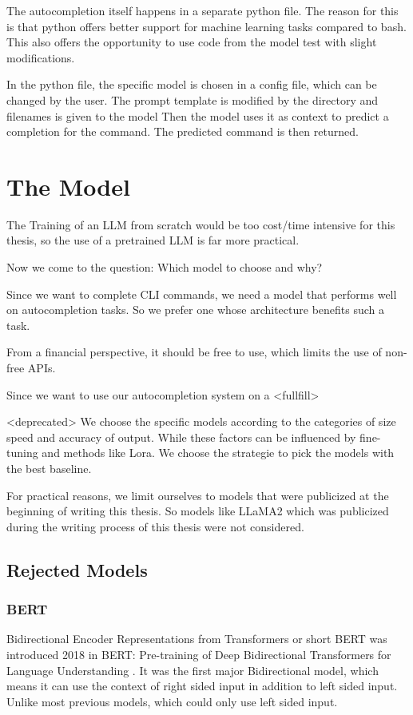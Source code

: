 The autocompletion itself happens in a separate python file. The reason for this is that python offers better support for machine learning tasks compared to bash. This also offers the opportunity to use code from the model test with slight modifications.

In the python file, the specific model is chosen in a config file, which can be changed by the user.
The prompt template is modified by the directory and filenames is given to the model
Then the model uses it as context to predict  a completion for the command.
The predicted command is then returned.



\section{The Model}\raggedbottom
The Training of an LLM from scratch would be too  cost/time intensive for this thesis, so the use of a pretrained LLM is far more practical.


Now  we come to the question: Which model to choose and why? 

Since we want to complete CLI commands, we need a model that performs well on autocompletion tasks. So we prefer one whose architecture benefits such a task.


From a financial perspective, it should be free to use, which limits the use of non-free APIs.


Since we want to use our autocompletion system on a 
<fullfill>

<deprecated>
We choose the specific models according to the categories of size speed and accuracy of output. While these factors can be influenced by fine-tuning and methods like Lora. We choose the strategie to pick the models with the best baseline.


For practical reasons, we limit ourselves to models that were publicized at the beginning of writing this thesis. So models like LLaMA2 which was publicized during the writing process of this thesis were not considered.



\subsection{Rejected Models}


\subsubsection{BERT}
Bidirectional Encoder Representations from Transformers or short BERT was introduced  2018  in BERT: Pre-training of Deep Bidirectional Transformers for
Language Understanding \cite{devlin2019bert}. It was the first major Bidirectional model, which means it can use the context of right sided input in addition to left sided input. Unlike most previous models, which could only use left sided input.


